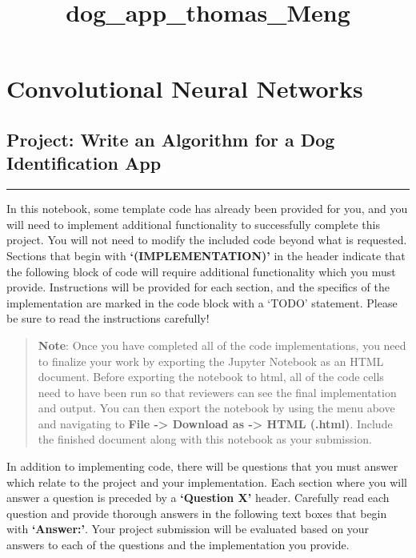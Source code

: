 \documentclass[11pt]{article}
\title{dog\_app\_thomas\_Meng}
\begin{document}
    
    
    \maketitle
    
    

    
    \hypertarget{convolutional-neural-networks}{%
\section{Convolutional Neural
Networks}\label{convolutional-neural-networks}}

\hypertarget{project-write-an-algorithm-for-a-dog-identification-app}{%
\subsection{Project: Write an Algorithm for a Dog Identification
App}\label{project-write-an-algorithm-for-a-dog-identification-app}}

\begin{center}\rule{0.5\linewidth}{\linethickness}\end{center}

In this notebook, some template code has already been provided for you,
and you will need to implement additional functionality to successfully
complete this project. You will not need to modify the included code
beyond what is requested. Sections that begin with
\textbf{`(IMPLEMENTATION)'} in the header indicate that the following
block of code will require additional functionality which you must
provide. Instructions will be provided for each section, and the
specifics of the implementation are marked in the code block with a
`TODO' statement. Please be sure to read the instructions carefully!

\begin{quote}
\textbf{Note}: Once you have completed all of the code implementations,
you need to finalize your work by exporting the Jupyter Notebook as an
HTML document. Before exporting the notebook to html, all of the code
cells need to have been run so that reviewers can see the final
implementation and output. You can then export the notebook by using the
menu above and navigating to \textbf{File -\textgreater{} Download as
-\textgreater{} HTML (.html)}. Include the finished document along with
this notebook as your submission.
\end{quote}

In addition to implementing code, there will be questions that you must
answer which relate to the project and your implementation. Each section
where you will answer a question is preceded by a \textbf{`Question X'}
header. Carefully read each question and provide thorough answers in the
following text boxes that begin with \textbf{`Answer:'}. Your project
submission will be evaluated based on your answers to each of the
questions and the implementation you provide.
\end{document}
